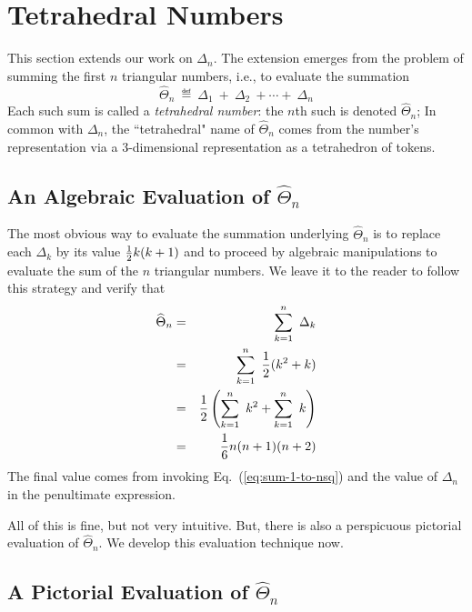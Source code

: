 \section{Tetrahedral Numbers}
\label{sec:tetraedralNumbers}

 

This section extends our work on $\Delta_n$.  The extension emerges from the problem of summing the first $n$ triangular numbers, i.e., to evaluate the summation
\[ \widehat{\Theta}_n \ \eqdef \ \Delta_1 \ + \ \Delta_2 \ + \cdots +\ \Delta_n \]
Each such sum is called a {\it tetrahedral number}: the  $n$th such is denoted $\widehat{\Theta}_n$; 
In common with $\Delta_n$, the ``tetrahedral" name of $\widehat{\Theta}_n$ comes from the number's representation via a 3-dimensional representation as a tetrahedron of tokens. 

\subsection{An Algebraic Evaluation of $\widehat{\Theta}_n$}

The most obvious way to evaluate the summation underlying $\widehat{\Theta}_n$ is to replace each $\Delta_k$ by its value ${1 \over 2}k (k+1)$ and to proceed by algebraic manipulations to evaluate the sum of the $n$ triangular numbers.  We leave it to the reader to follow this strategy and verify that
\begin{eqnarray*}
\widehat{\Theta}_n & = & \sum_{k=1}^{n} \ \Delta_k \\
      & = & \sum_{k=1}^{n} \ \frac{1}{2} (k^2 + k) \\
      & =  & \frac{1}{2} \left( \sum_{k=1}^{n} \ k^2 + \sum_{k=1}^{n}  \ k \right) \\
      & = & {1 \over 6} n (n+1)(n+2)
\end{eqnarray*}
The final value comes from invoking Eq.~(\ref{eq:sum-1-to-nsq}) and the value of $\Delta_n$ in the penultimate expression. 

\smallskip

All of this is fine, but not very intuitive.  But, there is also a perspicuous pictorial evaluation of $\widehat{\Theta}_n$.  We develop this evaluation technique now.

\subsection{A Pictorial Evaluation of $\widehat{\Theta}_n$}

